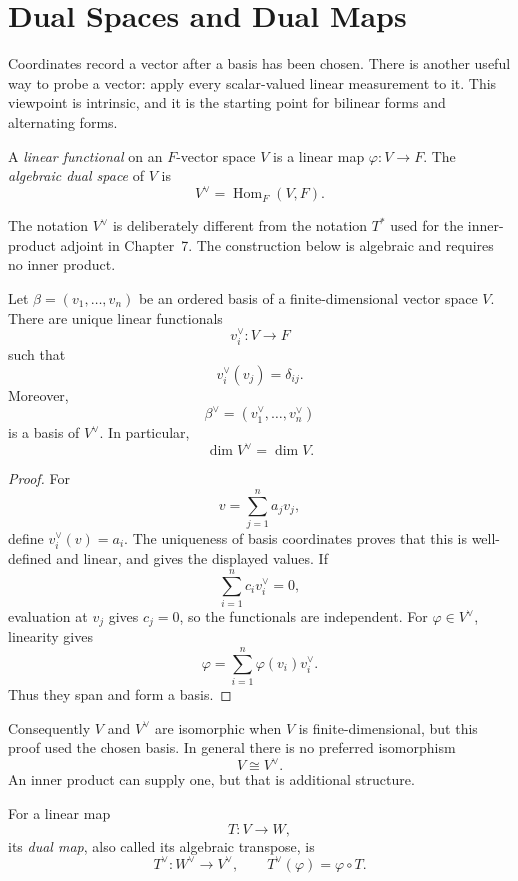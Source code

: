 \section{Dual Spaces and Dual Maps}\label{sec:dual-spaces}
Coordinates record a vector after a basis has been chosen.  There is another
useful way to probe a vector: apply every scalar-valued linear measurement to
it.  This viewpoint is intrinsic, and it is the starting point for
bilinear forms and alternating forms.

\begin{definition}
A \emph{linear functional} on an \(F\)-vector space \(V\) is a linear map
\(\varphi:V\to F\).  The \emph{algebraic dual space} of \(V\) is
\[
V^\vee=\operatorname{Hom}_F(V,F).
\]
\end{definition}

The notation \(V^\vee\) is deliberately different from the notation
\(T^*\) used for the inner-product adjoint in Chapter~7. The construction
below is algebraic and requires no inner product.

\begin{proposition}\label{prop:dual-basis}
Let \(\beta=(v_1,\ldots,v_n)\) be an ordered basis of a finite-dimensional
vector space \(V\).  There are unique linear functionals
\[
v_i^\vee:V\longrightarrow F
\]
such that
\[
v_i^\vee(v_j)=\delta_{ij}.
\]
Moreover,
\[
\beta^\vee=(v_1^\vee,\ldots,v_n^\vee)
\]
is a basis of \(V^\vee\).  In particular,
\[
\dim V^\vee=\dim V.
\]
\end{proposition}
\begin{proof}
For
\[
v=\sum_{j=1}^na_jv_j,
\]
define \(v_i^\vee(v)=a_i\).  The uniqueness of basis coordinates proves
that this is well-defined and linear, and gives the displayed values.
If
\[
\sum_{i=1}^nc_iv_i^\vee=0,
\]
evaluation at \(v_j\) gives \(c_j=0\), so the functionals are independent.
For \(\varphi\in V^\vee\), linearity gives
\[
\varphi=\sum_{i=1}^n\varphi(v_i)v_i^\vee.
\]
Thus they span and form a basis.
\end{proof}

Consequently \(V\) and \(V^\vee\) are isomorphic when \(V\) is
finite-dimensional, but this proof used the chosen basis.  In general there
is no preferred isomorphism
\[
V\cong V^\vee.
\]
An inner product can supply one, but that is additional structure.

\begin{definition}
For a linear map
\[
T:V\longrightarrow W,
\]
its \emph{dual map}, also called its algebraic transpose, is
\[
T^\vee:W^\vee\longrightarrow V^\vee,
\qquad
T^\vee(\varphi)=\varphi\circ T.
\]
\end{definition}

